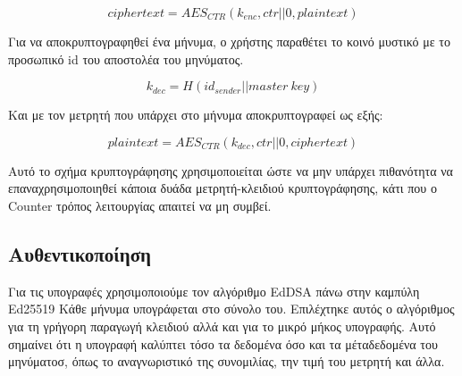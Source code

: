 \[
ciphertext = AES_{CTR}(k_{enc}, ctr||0, plaintext)
\]

Για να αποκρυπτογραφηθεί ένα μήνυμα, ο χρήστης παραθέτει το κοινό μυστικό με το προσωπικό id του αποστολέα του μηνύματος.

\[
k_{dec} = H(id_{sender} || master\ key)
\]

Και με τον μετρητή που υπάρχει στο μήνυμα αποκρυπτογραφεί ως εξής:

\[
plaintext = AES_{CTR}(k_{dec}, ctr||0, ciphertext)
\]

Αυτό το σχήμα κρυπτογράφησης χρησιμοποιείται ώστε να μην υπάρχει πιθανότητα να επαναχρησιμοποιηθεί κάποια δυάδα μετρητή-κλειδιού κρυπτογράφησης, κάτι που ο Counter τρόπος λειτουργίας απαιτεί να μη συμβεί.

\subsection{Αυθεντικοποίηση}

Για τις υπογραφές χρησιμοποιούμε τον αλγόριθμο EdDSA πάνω στην καμπύλη Ed25519
Κάθε μήνυμα υπογράφεται στο σύνολο του.
Επιλέχτηκε αυτός ο αλγόριθμος για τη γρήγορη παραγωγή κλειδιού αλλά και για το μικρό μήκος υπογραφής.
Αυτό σημαίνει ότι η υπογραφή καλύπτει τόσο τα δεδομένα όσο και τα μέταδεδομένα του μηνύματοσ, όπως το αναγνωριστικό της συνομιλίας, την τιμή του μετρητή και άλλα.

